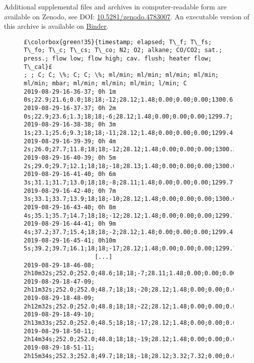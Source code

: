 \documentclass[12pt]{article}
\begin{document}
Additional supplemental files and archives in computer-readable form are available on Zenodo, see DOI: \href{http://dx.doi.org/10.5281/zenodo.4783007}{10.5281/zenodo.4783007}. An executable version of this archive is available on \href{https://mybinder.org/v2/zenodo/10.5281/zenodo.4783007/?filepath=index.ipynb}{Binder}.

\clearpage
\begin{landscape}
\begin{figure}[tbh]
\begin{lstlisting}[escapechar=£,
    linewidth=24cm]
£\colorbox{green!35}{timestamp; elapsed; T\_f; T\_fs; T\_fo; T\_c; T\_cs; T\_co; N2; O2; alkane; CO/CO2; sat.; press.; flow low; flow high; cav. flush; heater flow; T\_cal}£
; ; C; C; \%; C; C; \%; ml/min; ml/min; ml/min; ml/min; ml/min; mbar; ml/min; ml/min; ml/min; l/min; C
2019-08-29-16-36-37; 0h 1m 0s;22.9;21.6;0.0;18;18;-12;28.12;1.48;0.00;0.00;0.00;1300.6;1.210;0.00;15;8;20.6
2019-08-29-16-37-37; 0h 2m 0s;22.9;23.6;1.3;18;18;-6;28.12;1.48;0.00;0.00;0.00;1299.7;1.210;0.00;15;8;21.0
2019-08-29-16-38-38; 0h 3m 1s;23.1;25.6;9.3;18;18;-11;28.12;1.48;0.00;0.00;0.00;1299.4;1.209;0.00;15;8;20.5
2019-08-29-16-39-39; 0h 4m 2s;26.0;27.7;11.8;18;18;-12;28.12;1.48;0.00;0.00;0.00;1300.3;1.211;0.00;15;8;21.0
2019-08-29-16-40-39; 0h 5m 2s;29.0;29.7;12.1;18;18;-18;28.13;1.48;0.00;0.00;0.00;1300.0;1.210;0.00;15;8;20.3
2019-08-29-16-41-40; 0h 6m 3s;31.1;31.7;13.0;18;18;-8;28.11;1.48;0.00;0.00;0.00;1299.7;1.210;0.00;15;8;20.1
2019-08-29-16-42-40; 0h 7m 3s;33.1;33.7;13.9;18;18;-10;28.12;1.48;0.00;0.00;0.00;1300.0;1.211;0.00;15;8;20.3
2019-08-29-16-43-40; 0h 8m 4s;35.1;35.7;14.7;18;18;-12;28.12;1.48;0.00;0.00;0.00;1299.7;1.210;0.00;15;8;20.3
2019-08-29-16-44-41; 0h 9m 4s;37.2;37.7;15.4;18;18;-2;28.12;1.48;0.00;0.00;0.00;1299.4;1.212;0.00;15;8;20.9
2019-08-29-16-45-41; 0h10m 5s;39.2;39.7;16.1;18;18;-17;28.12;1.48;0.00;0.00;0.00;1299.7;1.210;0.00;15;8;21.9
                    [...]
2019-08-29-18-46-08; 2h10m32s;252.0;252.0;48.6;18;18;-7;28.11;1.48;0.00;0.00;0.00;1300.0;1.211;0.00;15;8;20.2
2019-08-29-18-47-09; 2h11m32s;252.0;252.0;48.7;18;18;-20;28.12;1.48;0.00;0.00;0.00;1300.6;1.211;0.00;15;8;20.2
2019-08-29-18-48-09; 2h12m32s;252.0;252.0;48.8;18;18;-22;28.12;1.48;0.00;0.00;0.00;1300.6;1.211;0.00;15;8;20.2
2019-08-29-18-49-10; 2h13m33s;252.0;252.0;48.5;18;18;-17;28.12;1.48;0.00;0.00;0.00;1300.0;1.212;0.00;15;8;20.7
2019-08-29-18-50-11; 2h14m34s;252.0;252.0;48.8;18;18;-19;28.12;1.48;0.00;0.00;0.00;1300.0;1.211;0.00;15;8;20.6
2019-08-29-18-51-11; 2h15m34s;252.3;252.8;49.7;18;18;-18;28.12;3.32;7.32;0.00;0.00;1300.0;0.653;0.95;15;8;20.6

\end{lstlisting}
\end{figure}
\end{landscape}
\end{document}
